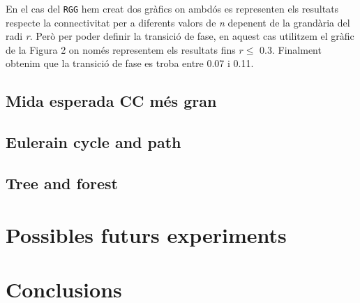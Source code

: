 En el cas del \texttt{RGG} hem creat dos gràfics on ambdós es representen els resultats respecte la connectivitat per a diferents valors de \textit{n} depenent de la grandària del radi \textit{r}. Però per poder definir la transició de fase, en aquest cas utilitzem el gràfic de la Figura 2 on només representem els resultats fins $r\leq$ 0.3. Finalment obtenim que la transició de fase es troba entre 0.07 i 0.11.

\subsection{Mida esperada CC més gran}

\subsection{Eulerain cycle and path}

\subsection{Tree and forest}


\section{Possibles futurs experiments}

\section{Conclusions}

\pagebreak

\printbibliography


